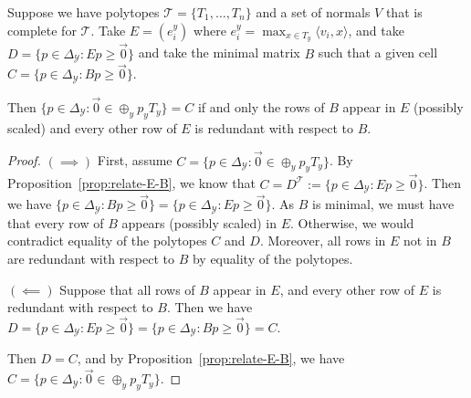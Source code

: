 \documentclass[anon]{colt2020} %
\newcommand{\Comments}{1}
\newcommand{\mytodo}[2]{\ifnum\Comments=1%
	\todo[linecolor=#1!80!black,backgroundcolor=#1,bordercolor=#1!80!black]{#2}\fi}
\newcommand{\btw}[1]{\mytodo{orange!20!white}{BTW: #1}}
\newcommand{\simplex}{\Delta_\Y}
\newcommand{\T}{\mathcal{T}}
\newcommand{\Y}{\mathcal{Y}}
\newcommand{\inprod}[2]{\langle #1, #2 \rangle}%
\begin{document}
\begin{proposition}\label{prop:relate-rows}
	Suppose we have polytopes $\T = \{T_1, \ldots, T_n\}$ and a set of normals $V$ that is complete for $\T$.
	Take $E = (e_{i}^y)$ where $e_{i}^y = \max_{x \in T_y} \inprod{v_i}{x}$, and take $D = \{p \in \simplex : Ep \geq \vec 0\}$ and take the minimal matrix $B$ such that a given cell $C = \{p \in \simplex : Bp \geq \vec 0\}$.
	
	Then $\{p \in \simplex : \vec 0 \in \oplus_y p_y T_y\} = C$	if and only the rows of $B$ appear in $E$ (possibly scaled) and every other row of $E$ is redundant with respect to $B$.
\end{proposition}
\begin{proof}
		$(\implies)$ First, assume $C = \{p \in \simplex: \vec 0 \in \oplus_y p_y T_y\}$.
		By Proposition~\ref{prop:relate-E-B}, we know that $C = D^\T := \{p \in \simplex : Ep \geq \vec 0\}$.
		Then we have $\{p \in \simplex : Bp \geq \vec 0\} = \{p \in \simplex : Ep \geq \vec 0\}$.
		As $B$ is minimal, we must have that every row of $B$ appears (possibly scaled) in $E$.
		Otherwise, we would contradict equality of the polytopes $C$ and $D$.
		Moreover, all rows in $E$ not in $B$ are redundant with respect to $B$ by equality of the polytopes.
		
		$(\impliedby)$ Suppose that all rows of $B$ appear in $E$, and every other row of $E$ is redundant with respect to $B$.
		Then we have $D = \{p\in \simplex : Ep \geq \vec 0\} = \{p \in \simplex : Bp \geq \vec 0\} = C$.
		
		Then $D = C$, and by Proposition~\ref{prop:relate-E-B}, we have $C = \{p \in \simplex : \vec 0 \in \oplus_y p_y T_y\}$.
\end{proof}
\end{document}
